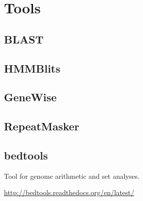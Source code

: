 \section{Tools}

\subsection{BLAST}

\subsection{HMMBlits}

\subsection{GeneWise}

\subsection{RepeatMasker}

\subsection{bedtools}
    Tool for genome arithmetic and set analyses.

    \url{http://bedtools.readthedocs.org/en/latest/}

